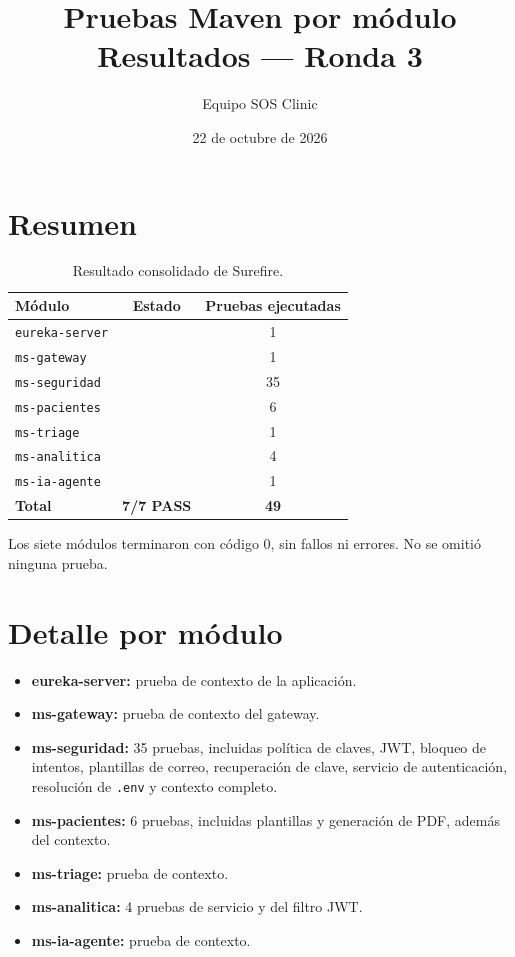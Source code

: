 \documentclass[11pt]{article}
\title{\textbf{Pruebas Maven por módulo}\\[0.3em]
\large Resultados --- Ronda 3}
\author{Equipo SOS Clinic}
\date{22 de octubre de 2026}
\begin{document}
\maketitle

\section{Resumen}

\begin{table}[h]
\centering
\small
\begin{tabular}{@{}lcc@{}}
\toprule
Módulo & Estado & Pruebas ejecutadas \\
\midrule
\texttt{eureka-server} & \ok{} & 1 \\
\texttt{ms-gateway} & \ok{} & 1 \\
\texttt{ms-seguridad} & \ok{} & 35 \\
\texttt{ms-pacientes} & \ok{} & 6 \\
\texttt{ms-triage} & \ok{} & 1 \\
\texttt{ms-analitica} & \ok{} & 4 \\
\texttt{ms-ia-agente} & \ok{} & 1 \\
\midrule
\textbf{Total} & \textbf{7/7 PASS} & \textbf{49} \\
\bottomrule
\end{tabular}
\caption{Resultado consolidado de Surefire.}
\end{table}

Los siete módulos terminaron con código 0, sin fallos ni errores. No se
omitió ninguna prueba.

\section{Detalle por módulo}

\begin{itemize}
  \item \textbf{eureka-server:} prueba de contexto de la aplicación.
  \item \textbf{ms-gateway:} prueba de contexto del gateway.
  \item \textbf{ms-seguridad:} 35 pruebas, incluidas política de claves, JWT,
  bloqueo de intentos, plantillas de correo, recuperación de clave, servicio de
  autenticación, resolución de \texttt{.env} y contexto completo.
  \item \textbf{ms-pacientes:} 6 pruebas, incluidas plantillas y generación de
  PDF, además del contexto.
  \item \textbf{ms-triage:} prueba de contexto.
  \item \textbf{ms-analitica:} 4 pruebas de servicio y del filtro JWT.
  \item \textbf{ms-ia-agente:} prueba de contexto.
\end{itemize}
\end{document}
